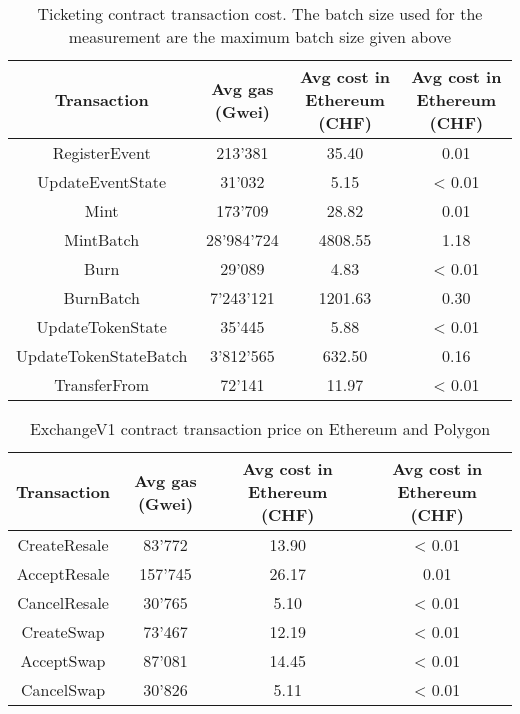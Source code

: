 \documentclass[a4paper,11pt,oneside]{report}
\begin{document}
\begin{table}[h!]
\begin{center}
\begin{NiceTabular}{ |c||c|c|c| }
 \hline
 Transaction & Avg gas (Gwei) & Avg cost in Ethereum (CHF) & Avg cost in Ethereum (CHF) \\
 \hline \hline
 RegisterEvent & 213'381 & 35.40 & 0.01 \\
 UpdateEventState & 31'032 & 5.15 & < 0.01 \\
 Mint & 173'709 & 28.82 & 0.01 \\
 MintBatch & 28'984'724 & 4808.55 & 1.18 \\
 Burn & 29'089 & 4.83 & < 0.01 \\
 BurnBatch & 7'243'121 & 1201.63 & 0.30 \\
 UpdateTokenState & 35'445 & 5.88 & < 0.01 \\
 UpdateTokenStateBatch & 3'812'565 & 632.50 & 0.16 \\
 TransferFrom & 72'141 & 11.97 & < 0.01 \\
 \hline
\end{NiceTabular}
\captionsetup{justification=centering}
\caption{Ticketing contract transaction cost. The batch size used for the measurement are the maximum batch size given above}
\label{table:ticketing_contract_transcation_cost}
\end{center}
\end{table}

\begin{table}[h!]
\begin{center}
\begin{NiceTabular}{ |c||c|c|c| }
 \hline
 Transaction & Avg gas (Gwei) & Avg cost in Ethereum (CHF) & Avg cost in Ethereum (CHF) \\
 \hline \hline
 CreateResale & 83'772 & 13.90 & < 0.01 \\
 AcceptResale & 157'745 & 26.17 & 0.01 \\
 CancelResale & 30'765 & 5.10 & < 0.01 \\
 CreateSwap & 73'467 & 12.19 & < 0.01 \\
 AcceptSwap & 87'081 & 14.45 & < 0.01 \\
 CancelSwap & 30'826 & 5.11 & < 0.01 \\
 \hline
\end{NiceTabular}
\caption{ExchangeV1 contract transaction price on Ethereum and Polygon}
\label{table:exchangeV1_contract_transaction_cost}
\end{center}
\end{table}
\end{document}
